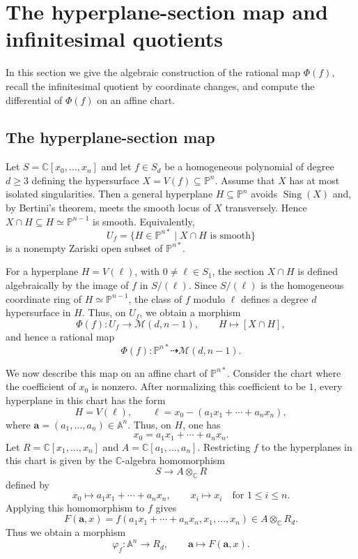 \documentclass[11pt]{amsart}
\theoremstyle{plain}
\theoremstyle{definition}
\numberwithin{equation}{section}
\newcommand{\M}{{\mathcal M}}
\newcommand{\C}{\mathbb{C}}
\newcommand{\PP}{\mathbb{P}}
\newcommand{\AAA}{\mathbb{A}}
\begin{document}


\section{The hyperplane-section map and infinitesimal quotients} \label{sec:map-and-quotients}

In this section we give the algebraic construction of the rational map $\Phi(f)$, recall the infinitesimal quotient by coordinate changes, and compute the
differential of $\Phi(f)$ on an affine chart.

\subsection{The hyperplane-section map}
\label{subsec:hyperplane-section-map}
Let $S=\C[x_0,\ldots,x_n]$ and let $f\in S_d$ be a homogeneous polynomial of degree
$d\geq 3$ defining the hypersurface $X=V(f)\subseteq \PP^n$. Assume that $X$ has at
most isolated singularities. Then a general hyperplane $H\subseteq \PP^n$ avoids
$\operatorname{Sing}(X)$ and, by Bertini's theorem, meets the smooth locus of $X$
transversely. Hence $X\cap H\subseteq H\simeq \PP^{n-1}$ is smooth. Equivalently,
\[
U_f=\{H\in \PP^{n*}\mid X\cap H \text{ is smooth}\}
\]
is a nonempty Zariski open subset of $\PP^{n*}$.

For a hyperplane $H=V(\ell)$, with $0\neq \ell\in S_1$, the section $X\cap H$ is
defined algebraically by the image of $f$ in $S/(\ell)$. Since $S/(\ell)$ is the
homogeneous coordinate ring of $H\simeq \PP^{n-1}$, the class of $f$ modulo $\ell$
defines a degree $d$ hypersurface in $H$. Thus, on $U_f$, we obtain a morphism
\[
\Phi(f):U_f\longrightarrow \M(d,n-1),\qquad H\longmapsto [X\cap H],
\]
and hence a rational map
\[
\Phi(f):\PP^{n*}\dashrightarrow \M(d,n-1).
\]

We now describe this map on an affine chart of $\PP^{n*}$. Consider the chart
where the coefficient of $x_0$ is nonzero. After normalizing this coefficient to be
$1$, every hyperplane in this chart has the form
\[
H=V(\ell),\qquad \ell=x_0-(a_1x_1+\cdots+a_nx_n),
\]
where $\mathbf a=(a_1,\ldots,a_n)\in \AAA^n$. Thus, on $H$, one has
\[
x_0=a_1x_1+\cdots+a_nx_n.
\]
Let $R=\C[x_1,\ldots,x_n]$ and $A=\C[a_1,\ldots,a_n]$. Restricting $f$ to the
hyperplanes in this chart is given by the $\C$-algebra homomorphism
\[
S\longrightarrow A\otimes_\C R
\]
defined by
\[
x_0\longmapsto a_1x_1+\cdots+a_nx_n,\qquad
x_i\longmapsto x_i\quad\text{for }1\leq i\leq n.
\]
Applying this homomorphism to $f$ gives
\[
F(\mathbf a,x)=f(a_1x_1+\cdots+a_nx_n,x_1,\ldots,x_n)
\in A\otimes_\C R_d.
\]
Thus we obtain a morphism
\[
\varphi_f:\AAA^n\longrightarrow R_d,\qquad
\mathbf a\longmapsto F(\mathbf a,x).
\]
\end{document}

